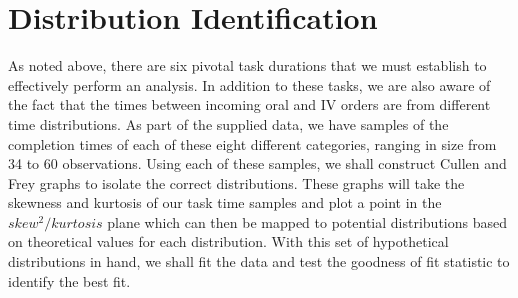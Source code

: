 \documentclass[10pt]{report}            %
\begin{document}
\section*{Distribution Identification}
As noted above, there are six pivotal task durations that we must establish to effectively perform an analysis. In addition to these tasks, we are also aware of the fact that the times between incoming oral and IV orders are from different time distributions. As part of the supplied data, we have samples of the completion times of each of these eight different categories, ranging in size from 34 to 60 observations. Using each of these samples, we shall construct Cullen and Frey graphs to isolate the correct distributions. These graphs will take the skewness and kurtosis of our task time samples and plot a point in the $skew^2/kurtosis$ plane which can then be mapped to potential distributions based on theoretical values for each distribution. With this set of hypothetical distributions in hand, we shall fit the data and test the goodness of fit statistic to identify the best fit.
\end{document}
